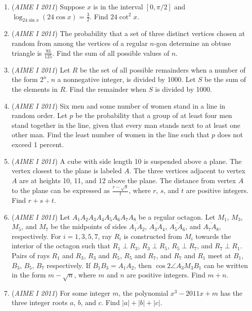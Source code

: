 \begin{enumerate}
	\item (\textit{AIME I 2011}) Suppose $x$ is in the interval $[0,\pi/2]$ and $\log_{24 \sin x} (24 \cos x) = \frac{3}{2}$.  Find $24 \cot^2 x$.


 

	\item (\textit{AIME I 2011}) The probability that a set of three distinct vertices chosen at random from among the vertices of a regular $n$-gon determine an obtuse triangle is $\frac{93}{125}$.  Find the sum of all possible values of $n$.


 

	\item (\textit{AIME I 2011}) Let $R$ be the set of all possible remainders when a number of the form $2^n$, $n$ a nonnegative integer, is divided by 1000. Let $S$ be the sum of the elements in $R$. Find the remainder when $S$ is divided by 1000.


 

	\item (\textit{AIME I 2011}) Six men and some number of women stand in a line in random order.  Let $p$ be the probability that a group of at least four men stand together in the line, given that every man stands next to at least one other man.  Find the least number of women in the line such that $p$ does not exceed 1 percent.


 

	\item (\textit{AIME I 2011}) A cube with side length 10 is suspended above a plane.  The vertex closest to the plane is labeled $A$. The three vertices adjacent to vertex $A$ are at heights 10, 11, and 12 above the plane.  The distance from vertex $A$ to the plane can be expressed as $\frac{r - \sqrt{s}}{t}$, where $r$, $s$, and $t$ are positive integers. Find $r + s + t$.


 

	\item (\textit{AIME I 2011}) Let $A_1 A_2 A_3 A_4 A_5 A_6 A_7 A_8$ be a regular octagon.  Let $M_1$, $M_3$, $M_5$, and $M_7$ be the midpoints of sides $\overline{A_1 A_2}$, $\overline{A_3 A_4}$, $\overline{A_5 A_6}$, and $\overline{A_7 A_8}$, respectively.  For $i = 1, 3, 5, 7$, ray $R_i$ is constructed from $M_i$ towards the interior of the octagon such that $R_1 \perp R_3$, $R_3 \perp R_5$, $R_5 \perp R_7$, and $R_7 \perp R_1$.  Pairs of rays $R_1$ and $R_3$, $R_3$ and $R_5$, $R_5$ and $R_7$, and $R_7$ and $R_1$ meet at $B_1$, $B_3$, $B_5$, $B_7$ respectively.  If $B_1 B_3 = A_1 A_2$, then $\cos 2 \angle A_3 M_3 B_1$ can be written in the form $m - \sqrt{n}$, where $m$ and $n$ are positive integers.  Find $m + n$.


 

	\item (\textit{AIME I 2011}) For some integer $m$, the polynomial $x^3 - 2011x + m$ has the three integer roots $a$, $b$, and $c$.  Find $|a| + |b| + |c|$.


 

\end{enumerate}